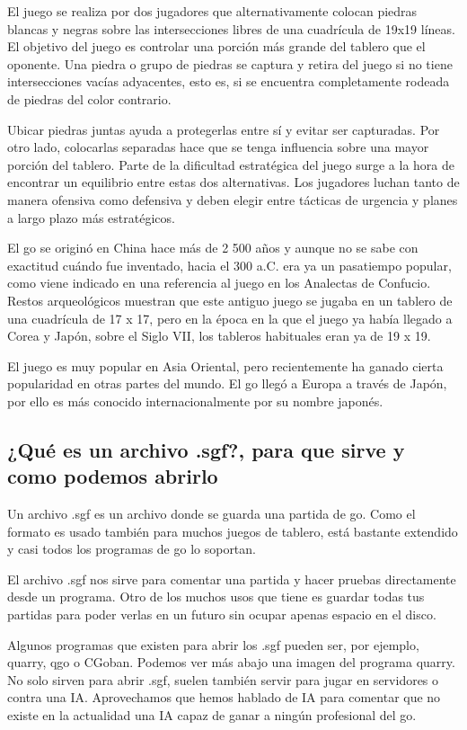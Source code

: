 \documentclass[12pt,a4paper]{report}
\begin{document}
El juego se realiza por dos jugadores que alternativamente colocan piedras
blancas y negras sobre las intersecciones libres de una cuadrícula de 19x19
líneas. El objetivo del juego es controlar una porción más grande del tablero
que el oponente. Una piedra o grupo de piedras se captura y retira del juego si
no tiene intersecciones vacías adyacentes, esto es, si se encuentra
completamente rodeada de piedras del color contrario.

Ubicar piedras juntas ayuda a protegerlas entre sí y evitar ser capturadas. Por
otro lado, colocarlas separadas hace que se tenga influencia sobre una mayor
porción del tablero. Parte de la dificultad estratégica del juego surge a la
hora de encontrar un equilibrio entre estas dos alternativas. Los jugadores
luchan tanto de manera ofensiva como defensiva y deben elegir entre tácticas de
urgencia y planes a largo plazo más estratégicos.

El go se originó en China hace más de 2 500 años y aunque no se sabe con
exactitud cuándo fue inventado, hacia el 300 a.C. era ya un pasatiempo popular,
como viene indicado en una referencia al juego en los Analectas de Confucio.
Restos arqueológicos muestran que este antiguo juego se jugaba en un tablero de
una cuadrícula de 17 x 17, pero en la época en la que el juego ya había llegado
a Corea y Japón, sobre el Siglo VII, los tableros habituales eran ya de 19 x 19.

El juego es muy popular en Asia Oriental, pero recientemente ha ganado cierta
popularidad en otras partes del mundo. El go llegó a Europa a través de Japón,
por ello es más conocido internacionalmente por su nombre japonés.


\subsection{¿Qué es un archivo .sgf?, para que sirve y como podemos abrirlo}

\label{sgf} Un archivo .sgf es un archivo donde se guarda una partida de
go. Como el formato es usado también para muchos juegos de tablero, está
bastante extendido y casi todos los programas de go lo soportan.

El archivo .sgf nos sirve para comentar una partida y hacer pruebas directamente
desde un programa. Otro de los muchos
usos que tiene es guardar todas tus partidas para poder verlas en un futuro sin
ocupar apenas espacio en el disco. 

Algunos programas que existen para abrir los .sgf pueden ser, por ejemplo,
quarry, qgo o CGoban. Podemos ver más abajo una imagen del programa quarry. No
solo sirven para abrir .sgf, suelen también servir para jugar en servidores o
contra una IA. Aprovechamos que hemos hablado de IA para comentar que no existe
en la actualidad una IA capaz de ganar a ningún profesional del go.
\end{document}
